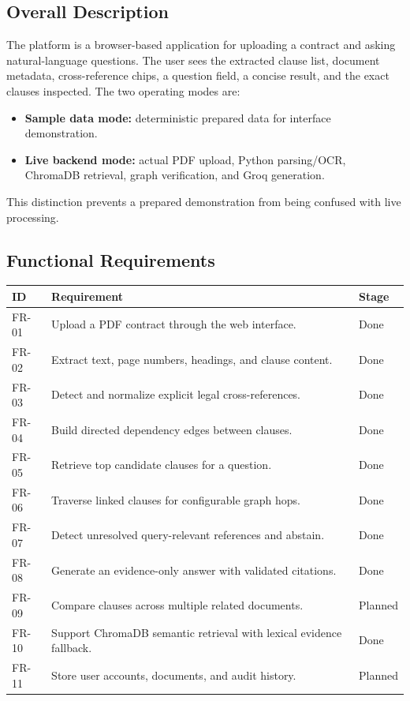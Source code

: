 \documentclass[12pt,a4paper,oneside]{report}
\begin{document}
\subsection{Overall Description}
The platform is a browser-based application for uploading a contract and asking natural-language questions. The user sees the extracted clause list, document metadata, cross-reference chips, a question field, a concise result, and the exact clauses inspected. The two operating modes are:

\begin{itemize}
  \item \textbf{Sample data mode:} deterministic prepared data for interface demonstration.
  \item \textbf{Live backend mode:} actual PDF upload, Python parsing/OCR, ChromaDB retrieval, graph verification, and Groq generation.
\end{itemize}

This distinction prevents a prepared demonstration from being confused with live processing.

\subsection{Functional Requirements}
\begin{longtable}{p{}p{}p{}}
\toprule
\textbf{ID} & \textbf{Requirement} & \textbf{Stage}\\
\midrule
FR-01 & Upload a PDF contract through the web interface. & Done\\
FR-02 & Extract text, page numbers, headings, and clause content. & Done\\
FR-03 & Detect and normalize explicit legal cross-references. & Done\\
FR-04 & Build directed dependency edges between clauses. & Done\\
FR-05 & Retrieve top candidate clauses for a question. & Done\\
FR-06 & Traverse linked clauses for configurable graph hops. & Done\\
FR-07 & Detect unresolved query-relevant references and abstain. & Done\\
FR-08 & Generate an evidence-only answer with validated citations. & Done\\
FR-09 & Compare clauses across multiple related documents. & Planned\\
FR-10 & Support ChromaDB semantic retrieval with lexical evidence fallback. & Done\\
FR-11 & Store user accounts, documents, and audit history. & Planned\\
\bottomrule
\end{longtable}
\end{document}
